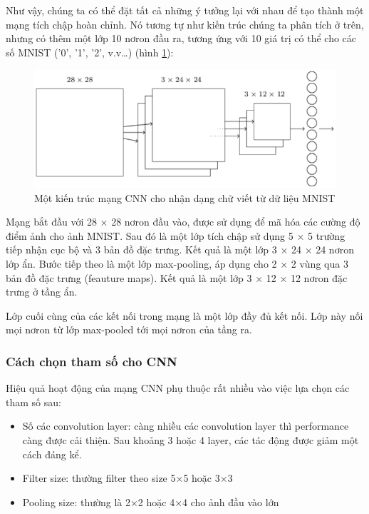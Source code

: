Như vậy, chúng ta có thể đặt tất cả những ý tưởng lại với nhau để tạo thành một mạng tích chập hoàn chỉnh. Nó tương tự như kiến trúc chúng ta phân tích ở trên, nhưng có thêm một lớp 10 nơron đầu ra, tương ứng với 10 giá trị có thể cho các số MNIST ('0', '1', '2', v.v…) (hình \ref{fig:cnnnhandangchuviet}):
\begin{figure}[H]
	\centering
	\includegraphics[width=1\linewidth]{images/cnnnhandangchuviet.png}
	\caption{Một kiến trúc mạng CNN cho nhận dạng chữ viết từ dữ liệu MNIST}
	\label{fig:cnnnhandangchuviet}
\end{figure}
Mạng bắt đầu với 28 × 28 nơron đầu vào, được sử dụng để mã hóa các cường độ điểm ảnh cho ảnh MNIST. Sau đó là một lớp tích chập sử dụng 5 × 5 trường tiếp nhận cục bộ và 3 bản đồ đặc trưng. Kết quả là một lớp 3 × 24 × 24 nơron lớp ẩn. Bước tiếp theo là một lớp max-pooling, áp dụng cho 2 × 2 vùng qua 3 bản đồ đặc trưng (feauture maps). Kết quả là một lớp 3 × 12 × 12 nơron đặc trưng ở tầng ẩn.

Lớp cuối cùng của các kết nối trong mạng là một lớp đầy đủ kết nối. Lớp này nối mọi nơron từ lớp max-pooled tới mọi nơron của tầng ra.

\subsubsection{Cách chọn tham số cho CNN}
Hiệu quả hoạt động của mạng CNN phụ thuộc rất nhiều vào việc lựa chọn các tham số sau:

\begin{itemize}
	\item Số các convolution layer: càng nhiều các convolution layer thì performance càng được cải thiện. Sau khoảng 3 hoặc 4 layer, các tác động được giảm một cách đáng kể.
	\item Filter size: thường filter theo size 5×5 hoặc 3×3
	\item Pooling size: thường là 2×2 hoặc 4×4 cho ảnh đầu vào lớn
\end{itemize}

